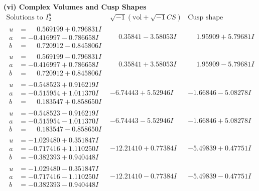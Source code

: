 \documentclass[1p]{elsarticle_modified}
\theoremstyle{definition}
\newcommand{\I}{\sqrt{-1}}
\begin{document}
\newpage\flushleft \textbf{(vi) Complex Volumes and Cusp Shapes}
$$\begin{array}{c|c|c}  
\text{Solutions to }I^u_{2}& \I (\text{vol} + \sqrt{-1}CS) & \text{Cusp shape}\\
 \hline 
\begin{aligned}
u &= \phantom{-}0.569199 + 0.796831 I \\
a &= -0.416997 - 0.786658 I \\
b &= \phantom{-}0.720912 - 0.845806 I\end{aligned}
 & \phantom{-}0.35841 - 3.58053 I & \phantom{-}1.95909 + 5.79681 I \\ \hline\begin{aligned}
u &= \phantom{-}0.569199 - 0.796831 I \\
a &= -0.416997 + 0.786658 I \\
b &= \phantom{-}0.720912 + 0.845806 I\end{aligned}
 & \phantom{-}0.35841 + 3.58053 I & \phantom{-}1.95909 - 5.79681 I \\ \hline\begin{aligned}
u &= -0.548523 + 0.916219 I \\
a &= -0.515954 + 1.011370 I \\
b &= \phantom{-}0.183547 + 0.858650 I\end{aligned}
 & -6.74443 + 5.52946 I & -1.66846 - 5.08278 I \\ \hline\begin{aligned}
u &= -0.548523 - 0.916219 I \\
a &= -0.515954 - 1.011370 I \\
b &= \phantom{-}0.183547 - 0.858650 I\end{aligned}
 & -6.74443 - 5.52946 I & -1.66846 + 5.08278 I \\ \hline\begin{aligned}
u &= -1.029480 + 0.351847 I \\
a &= -0.717416 + 1.110250 I \\
b &= -0.382393 + 0.940448 I\end{aligned}
 & -12.21410 + 0.77384 I & -5.49839 + 0.47751 I \\ \hline\begin{aligned}
u &= -1.029480 - 0.351847 I \\
a &= -0.717416 - 1.110250 I \\
b &= -0.382393 - 0.940448 I\end{aligned}
 & -12.21410 - 0.77384 I & -5.49839 - 0.47751 I \\ \hline\begin{aligned}

\end{aligned}
\end{array}$$
\end{document}

